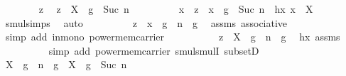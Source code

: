 \begin{isabellebody}
\isanewline
\ \ \ \ \ \ \isamarkupfalse%
\ z\ \isamarkupfalse%
\ {\isachardoublequoteopen}z\ {\isasymin}\ X\ {\isasymcdots}\ {\isacharbraceleft}{\kern0pt}g\ {\isacharcircum}{\kern0pt}\ Suc\ n{\isacharbraceright}{\kern0pt}{\isachardoublequoteclose}\isanewline
\ \ \ \ \ \ \isamarkupfalse%
\ \isamarkupfalse%
\ x\ \ {\isachardoublequoteopen}z\ {\isacharequal}{\kern0pt}\ x\ {\isasymcdot}\ {\isacharparenleft}{\kern0pt}g\ {\isacharcircum}{\kern0pt}\ Suc\ n{\isacharparenright}{\kern0pt}{\isachardoublequoteclose}\ \ hx{\isacharcolon}{\kern0pt}\ {\isachardoublequoteopen}x\ {\isasymin}\ X{\isachardoublequoteclose}\ \ \isamarkupfalse%
\ smul{\isachardot}{\kern0pt}simps\ \isamarkupfalse%
\ auto\isanewline
\ \ \ \ \ \ \isamarkupfalse%
\ \isamarkupfalse%
\ {\isachardoublequoteopen}z\ {\isacharequal}{\kern0pt}\ {\isacharparenleft}{\kern0pt}x\ {\isasymcdot}\ g\ {\isacharcircum}{\kern0pt}\ n{\isacharparenright}{\kern0pt}\ {\isasymcdot}\ g{\isachardoublequoteclose}\ \isamarkupfalse%
\ assms\ associative\ \isamarkupfalse%
\ {\isacharparenleft}{\kern0pt}simp\ add{\isacharcolon}{\kern0pt}\ in{\isacharunderscore}{\kern0pt}mono\ power{\isacharunderscore}{\kern0pt}mem{\isacharunderscore}{\kern0pt}carrier{\isacharparenright}{\kern0pt}\ \isanewline
\ \ \ \ \ \ \isamarkupfalse%
\ \isamarkupfalse%
\ {\isachardoublequoteopen}z\ {\isasymin}\ {\isacharparenleft}{\kern0pt}X\ {\isasymcdots}\ {\isacharbraceleft}{\kern0pt}g\ {\isacharcircum}{\kern0pt}\ n{\isacharbraceright}{\kern0pt}{\isacharparenright}{\kern0pt}\ {\isasymcdots}\ {\isacharbraceleft}{\kern0pt}g{\isacharbraceright}{\kern0pt}{\isachardoublequoteclose}\ \isamarkupfalse%
\ hx\ assms\ \isanewline
\ \ \ \ \ \ \ \ \isamarkupfalse%
\ {\isacharparenleft}{\kern0pt}simp\ add{\isacharcolon}{\kern0pt}\ power{\isacharunderscore}{\kern0pt}mem{\isacharunderscore}{\kern0pt}carrier\ smul{\isachardot}{\kern0pt}smulI\ subsetD{\isacharparenright}{\kern0pt}\isanewline
\ \ \ \ \isamarkupfalse%
\isanewline
\ \ \isamarkupfalse%
\isanewline
\ \ \ \ \isamarkupfalse%
\ {\isachardoublequoteopen}{\isacharparenleft}{\kern0pt}X\ {\isasymcdots}\ {\isacharbraceleft}{\kern0pt}g\ {\isacharcircum}{\kern0pt}\ n{\isacharbraceright}{\kern0pt}{\isacharparenright}{\kern0pt}\ {\isasymcdots}\ {\isacharbraceleft}{\kern0pt}g{\isacharbraceright}{\kern0pt}\ {\isasymsubseteq}\ X\ {\isasymcdots}\ {\isacharbraceleft}{\kern0pt}g\ {\isacharcircum}{\kern0pt}\ Suc\ n{\isacharbraceright}{\kern0pt}{\isachardoublequoteclose}\isanewline

\end{isabellebody}
